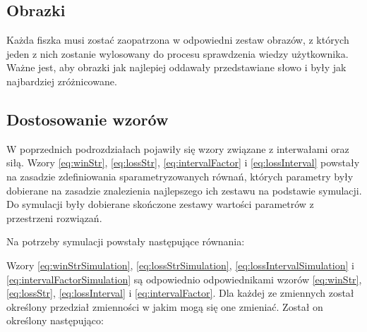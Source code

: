 \subsection{Obrazki}

Każda fiszka musi zostać zaopatrzona w odpowiedni zestaw obrazów, z których jeden z nich zostanie wylosowany do procesu sprawdzenia wiedzy użytkownika. Ważne jest, aby obrazki jak najlepiej oddawały przedstawiane słowo i były jak najbardziej zróżnicowane.

\subsection{Dostosowanie wzorów}

W poprzednich podrozdziałach pojawiły się wzory związane z interwałami oraz siłą. Wzory \ref{eq:winStr}, \ref{eq:lossStr}, \ref{eq:intervalFactor} i \ref{eq:lossInterval} powstały na zasadzie zdefiniowania sparametryzowanych równań, których parametry były dobierane na zasadzie znalezienia najlepszego ich zestawu na podstawie symulacji. Do symulacji były dobierane skończone zestawy wartości parametrów z przestrzeni rozwiązań.

Na potrzeby symulacji powstały następujące równania:



Wzory \ref{eq:winStrSimulation}, \ref{eq:lossStrSimulation}, \ref{eq:lossIntervalSimulation} i \ref{eq:intervalFactorSimulation} są odpowiednio odpowiednikami wzorów  \ref{eq:winStr}, \ref{eq:lossStr}, \ref{eq:lossInterval} i \ref{eq:intervalFactor}. Dla każdej ze zmiennych został określony przedział zmienności w jakim mogą się one zmieniać. Został on określony następująco:


